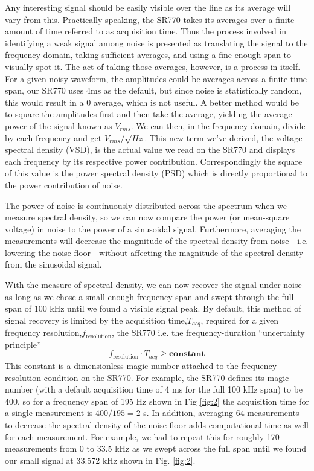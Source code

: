 \documentclass[prl,twocolumn,superscriptaddress,floatfix]{revtex4}
\begin{document}
Any interesting signal should be easily visible over the line as its average will vary from this.
Practically speaking, the SR770 takes its averages over a finite amount of time referred to as acquisition time.
Thus the process involved in identifying a weak signal among noise is presented as translating the signal to the frequency domain, taking sufficient averages, and using a fine enough span to visually spot it.
The act of taking those averages, however, is a process in itself. For a given noisy waveform, the amplitudes could be averages across a finite time span, our SR770 uses 4ms as the default, but since noise is statistically random, this would result in a 0 average, which is not useful. 
A better method would be to square the amplitudes first and then take the average, yielding the average power of the signal known as $V_{rms}$. 
We can then, in the frequency domain, divide by each frequency and get $V_{rms}/\sqrt{Hz}$. 
This new term we've derived, the voltage spectral density (VSD), is the actual value we read on the SR770 and displays each frequency by its respective power contribution. Correspondingly the square of this value is the power spectral density (PSD) which is directly proportional to the power contribution of noise.

The power of noise is continuously distributed across the spectrum when we measure spectral density, so we can now compare the power (or mean-square voltage) in noise to the power of a sinusoidal signal. Furthermore, averaging the measurements will decrease the magnitude of the spectral density from noise---i.e. lowering the noise floor---without affecting the magnitude of the spectral density from the sinusoidal signal. 

With the measure of spectral density, we can now recover the signal under noise as long as we chose a small enough frequency span and swept through the full span of 100 kHz until we found a visible signal peak. 
By default, this method of signal recovery is limited by the acquisition time,$T_{acq}$, required for a given frequency resolution,$f_\textrm{resolution}$, the SR770 i.e.
the frequency-duration ``uncertainty principle'' \cite{fouriermethods}
\begin{equation}
    f_\textrm{resolution} \cdot T_{acq} \geq \textbf{constant}
\end{equation}
This constant is a dimensionless magic number attached to the frequency-resolution condition on the SR770. For example,
the SR770 defines its magic number (with a default acquisition time of 4 ms for the full 100 kHz span)
to be $400$, so for a frequency span of 195 Hz shown in Fig \ref{fig:2} the acquisition time for a single measurement is $400 / 195 = 2$ s. In addition, averaging 64 measurements to decrease the spectral density of the noise floor adds computational time as well for each measurement. For example, we had to repeat this for roughly 170 measurements from 0 to 33.5 kHz as we swept across the full span until we found our small signal at 33.572 kHz shown in Fig. \ref{fig:2}.
\end{document}
